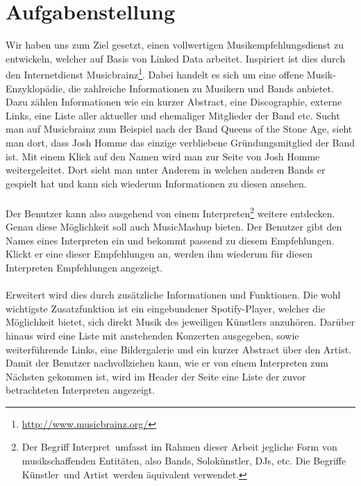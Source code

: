 \section{Aufgabenstellung}


Wir haben uns zum Ziel gesetzt, einen vollwertigen Musikempfehlungsdienst zu entwickeln, welcher auf Basis von Linked Data arbeitet. Inspiriert ist dies durch den Internetdienst Musicbrainz\footnote{\url{http://www.musicbrainz.org/}}. Dabei handelt es sich um eine offene Musik-Enzyklopädie, die zahlreiche Informationen zu Musikern und Bands anbietet. Dazu zählen Informationen wie ein kurzer Abstract, eine Discographie, externe Links, eine Liste aller aktueller und ehemaliger Mitglieder der Band etc. Sucht man auf Musicbrainz zum Beispiel nach der Band \glqq Queens of the Stone Age\grqq, sieht man dort, dass Josh Homme das einzige verbliebene Gründungsmitglied der Band ist. Mit einem Klick auf den Namen wird man zur Seite von Josh Homme weitergeleitet. Dort sieht man unter Anderem in welchen anderen Bands er gespielt hat und kann sich wiederum Informationen zu diesen ansehen.

\paragraph{} Der Benutzer kann also ausgehend von einem Interpreten\footnote{Der Begriff \glqq Interpret\grqq \ umfasst im Rahmen dieser Arbeit jegliche Form von \glqq musikschaffenden Entitäten\grqq, also Bands, Solokünstler, DJs, etc. Die Begriffe \glqq Künstler\grqq \ und \glqq Artist\grqq \ werden äquivalent verwendet.} weitere entdecken. Genau diese Möglichkeit soll auch MusicMashup bieten. Der Benutzer gibt den Names eines Interpreten ein und bekommt passend zu diesem Empfehlungen. Klickt er eine dieser Empfehlungen an, werden ihm wiederum für diesen Interpreten Empfehlungen angezeigt. 


\paragraph{} Erweitert wird dies durch zusätzliche Informationen und Funktionen. Die wohl wichtigste Zusatzfunktion ist ein eingebundener Spotify-Player, welcher die Möglichkeit bietet, sich direkt Musik des jeweiligen Künstlers anzuhören. Darüber hinaus wird eine Liste mit anstehenden Konzerten ausgegeben, sowie weiterführende Links, eine Bildergalerie und ein kurzer Abstract über den Artist. Damit der Benutzer nachvollziehen kann, wie er von einem Interpreten zum Nächsten gekommen ist, wird im Header der Seite eine Liste der zuvor betrachteten Interpreten angezeigt.

